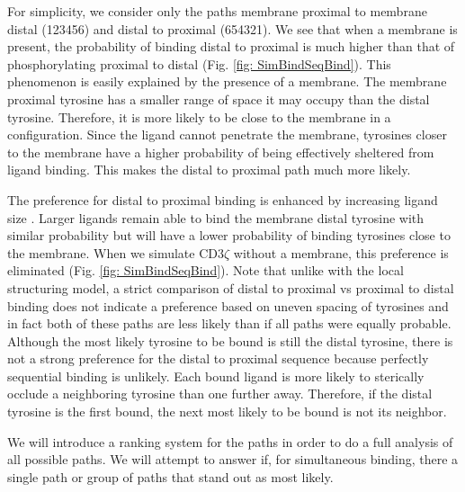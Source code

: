 \documentclass[../../AdvancementSummary.tex]{subfiles}
\begin{document}
For simplicity, we consider only the paths membrane proximal to membrane distal (123456) and distal to proximal (654321). We see that when a membrane is present, the probability of binding distal to proximal is much higher than that of phosphorylating proximal to distal (Fig. \ref{fig: SimBindSeqBind}). This phenomenon is easily explained by the presence of a membrane. The membrane proximal tyrosine has a smaller range of space it may occupy than the distal tyrosine. Therefore, it is more likely to be close to the membrane in a configuration. Since the ligand cannot penetrate the membrane, tyrosines closer to the membrane have a higher probability of being effectively sheltered from ligand binding. This makes the distal to proximal path much more likely. 

The preference for distal to proximal binding is enhanced by increasing ligand size . Larger ligands remain able to bind the membrane distal tyrosine with similar probability but will have a lower probability of binding tyrosines close to the membrane. When we simulate CD3$\zeta$ without a membrane, this preference is eliminated (Fig. \ref{fig: SimBindSeqBind}). Note that unlike with the local structuring model, a strict comparison of distal to proximal vs proximal to distal binding does not indicate a preference based on uneven spacing of tyrosines and in fact both of these paths are less likely than if all paths were equally probable. Although the most likely tyrosine to be bound is still the distal tyrosine, there is not a strong preference for the distal to proximal sequence because perfectly sequential binding is unlikely. Each bound ligand is more likely to sterically occlude a neighboring tyrosine than one further away. Therefore, if the distal tyrosine is the first bound, the next most likely to be bound is not its neighbor.

We will introduce a ranking system for the paths in order to do a full analysis of all possible paths. We will attempt to answer if, for simultaneous binding, there a single path or group of paths that stand out as most likely. 
\end{document}
